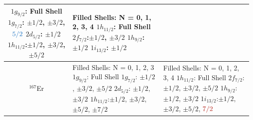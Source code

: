 \documentclass[10pt,a4paper, twoside, openright]{report}
\begin{document}
\begin{longtable}{cll}
{    $1g_{9/2}$: Full Shell \\
    $1g_{7/2}$: $\pm 1/2$, $\pm 3/2$, $\textcolor{RoyalBlue}{5/2}$ \\
    $2d_{5/2}$: $\pm 1/2$ \\ 
    $1h_{11/2}$:$\pm 1/2$, $\pm 3/2$, $\pm 5/2$}          
    &  \pbox{20cm}{Filled Shells: N = 0, 1, 2, 3, 4 \\
    $1h_{11/2}$: Full Shell \\
    $2f_{7/2}$:$\pm 1/2$, $\pm 3/2$ \\
    $1h_{9/2}$: $\pm 1/2$ \\
    $1i_{13/2}$: $\pm 1/2$} \\
\midrule
$^{167}$Er           
    &  \pbox{20cm}{Filled Shells: N = 0, 1, 2, 3 \\
    $1g_{9/2}$: Full Shell \\
    $1g_{7/2}$: $\pm 1/2$, $\pm 3/2$, $\pm 5/2$\\
    $2d_{5/2}$: $\pm 1/2$, $\pm 3/2$ \\
    $1h_{11/2}$:$\pm 1/2$, $\pm 3/2$, $\pm 5/2$, $\pm 7/2$ }              
    &  \pbox{20cm}{Filled Shells: N = 0, 1, 2, 3, 4 \\
    $1h_{11/2}$: Full Shell \\
    $2f_{7/2}$: $\pm 1/2$, $\pm 3/2$, $\pm 5/2$ \\
    $1h_{9/2}$: $\pm 1/2$, $\pm 3/2$ \\
    $1i_{13/2}$:$\pm 1/2$, $\pm 3/2$, $\pm 5/2$, $\textcolor{BrickRed}{7/2}$} \\
\bottomrule
\bottomrule
\end{longtable}
\clearpage
\listoffigures
\clearpage
\listoftables



\end{document}

